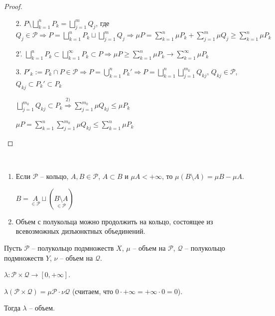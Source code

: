 \begin{proof}~
    \begin{enumerate}
        \item[2.] $P\setminus \bigsqcup\limits_{k=1}^n P_k = \bigsqcup\limits_{j=1}^m Q_j$, где $Q_j \in \mathcal{P}\Rightarrow
        P = \bigsqcup\limits_{k=1}^n P_k \sqcup \bigsqcup\limits_{j=1}^m Q_j\Rightarrow \mu P = \sum\limits_{k=1}^n \mu P_k +
        \sum\limits_{j=1}^m \mu Q_j \geq \sum\limits_{k=1}^n \mu P_k$

        \item[2'.] $\bigsqcup\limits_{k=1}^n P_k \subset \bigsqcup\limits_{k=1}^\infty P_k \subset P \Rightarrow
        \mu P \geq \sum\limits_{k=1}^n \mu P_k \rightarrow \sum\limits_{k=1}^\infty \mu P_k$
        \item[3.] $P'_k:= P_k \cap P \in \mathcal{P} \Rightarrow P = \bigcup\limits_{k=1}^n P_k' \Rightarrow P = \bigsqcup\limits_{k=1}^n \bigsqcup\limits_{j=1}^{m_k} Q_{kj}$,
        $Q_{kj}\in \mathcal{P}$, $Q_{kj}\subset P_k' \subset P_k$

        $\bigsqcup\limits_{j=1}^{m_k} Q_{kj} \subset P_k \overset{2)}{\Rightarrow} \sum\limits_{j=1}^{m_k}\mu Q_{kj} \leq \mu P_k$

        $\mu P =  \sum\limits_{k=1}^{n} \sum\limits_{j=1}^{m_k} \mu Q_{kj} \leq  \sum\limits_{k=1}^{n} \mu P_k$
    \end{enumerate}
\end{proof}

\begin{remark}~
    \begin{enumerate} 
        \item Если $\mathcal{P}$ – кольцо, $A, B\in \mathcal{P}$, $A\subset B$ и $\mu A <+\infty$, то $\mu (B \setminus A)=\mu B - \mu A$.
        
        $B = \underset{\in \mathcal{P}}{A}\sqcup (\underset{\in \mathcal{P}}{B\setminus A})$
        \item Объем с полукольца можно продолжить на кольцо, состоящее из всевозможных дизъюнктных объединений.
    \end{enumerate}
\end{remark}

\begin{theorem}
    Пусть $\mathcal{P}$ – полукольцо подмножеств $X$, $\mu$ – объем на $\mathcal{P}$, 
    $\mathcal{Q}$ – полукольцо подмножеств $Y$, $\nu$ – объем на $\mathcal{Q}$.

    $\lambda: \mathcal{P}\times \mathcal{Q}\rightarrow [0, +\infty]$.

    $\lambda(\mathcal{P}\times \mathcal{Q}) = \mu \mathcal{P} \cdot \nu \mathcal{Q}$ (считаем,
    что $0 \cdot + \infty = +\infty \cdot 0 = 0$). 
    
    Тогда $\lambda$ – объем.
\end{theorem}

